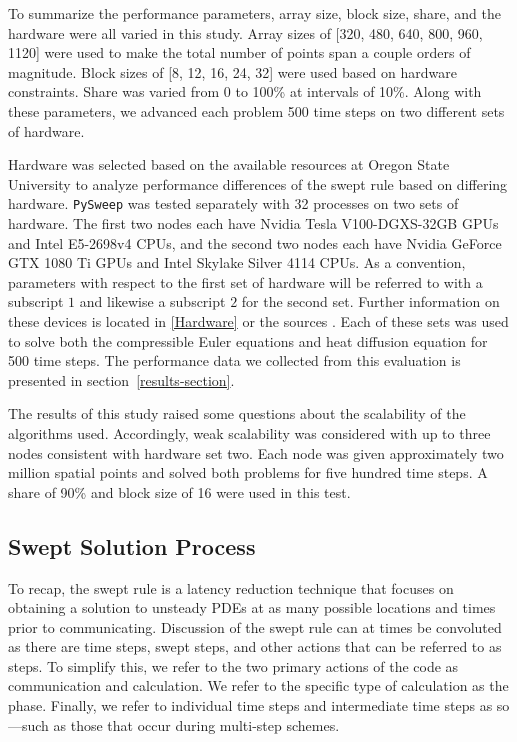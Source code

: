 \documentclass[preprints,article,accept,moreauthors,pdftex]{Definitions/mdpi}
\def\pysweep{\texttt{PySweep}}
\def\oldCPU{Intel Skylake Silver 4114} %
\def\oldGPU{Nvidia GeForce GTX 1080 Ti}
\def\newCPU{Intel E5-2698v4} %
\def\newGPU{Nvidia Tesla V100-DGXS-32GB}
\begin{document}
\par
To summarize the performance parameters, array size, block size, share, and the hardware were all varied in this study. Array sizes of [320, 480, 640, 800, 960, 1120] were used to make the total number of points span a couple orders of magnitude. Block sizes of [8, 12, 16, 24, 32] were used based on hardware constraints. Share was varied from 0 to 100\% at intervals of 10\%. Along with these parameters, we advanced each problem 500 time steps on two different sets of hardware.

\par
Hardware was selected based on the available resources at Oregon State University to analyze performance differences of the swept rule based on differing hardware. \pysweep{} was tested separately with 32 processes on two sets of hardware. The first two nodes each have \newGPU{} GPUs and \newCPU{} CPUs, and the second two nodes each have \oldGPU{} GPUs and \oldCPU{} CPUs. As a convention, parameters with respect to the first set of hardware will be referred to with a subscript $1$ and likewise a subscript $2$ for the second set. Further information on these devices is located in \ref{Hardware} or the sources \cite{Intel123550,Intel91753,GeForceGeForce,NVIDIANVIDIA}. Each of these sets was used to solve both the compressible Euler equations and heat diffusion equation for 500 time steps. The performance data we collected from this evaluation is presented in section~\ref{results-section}. 

\par 
The results of this study raised some questions about the scalability of the algorithms used. Accordingly, weak scalability was considered with up to three nodes consistent with hardware set two. Each node was given approximately two million spatial points and solved both problems for five hundred time steps. A share of 90\% and block size of 16 were used in this test. 

\subsection{Swept Solution Process}
\label{swept-process-section}
To recap, the swept rule is a latency reduction technique that focuses on obtaining a solution to unsteady PDEs at as many possible locations and times prior to communicating. Discussion of the swept rule can at times be convoluted as there are time steps, swept steps, and other actions that can be referred to as steps. To simplify this, we refer to the two primary actions of the code as communication and calculation. We refer to the specific type of calculation as the phase. Finally, we refer to individual time steps and intermediate time steps as so---such as those that occur during multi-step schemes. 
\end{document}
